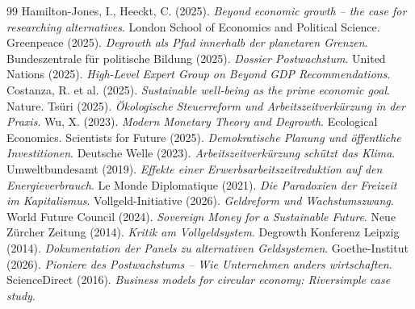 \documentclass[12pt, a4paper]{article}
\begin{document}
\begin{thebibliography}{99}
		 Hamilton-Jones, I., Heeckt, C. (2025). \textit{Beyond economic growth – the case for researching alternatives}. London School of Economics and Political Science.
		 Greenpeace (2025). \textit{Degrowth als Pfad innerhalb der planetaren Grenzen}.
		 Bundeszentrale für politische Bildung (2025). \textit{Dossier Postwachstum}.
		 United Nations (2025). \textit{High-Level Expert Group on Beyond GDP Recommendations}.
		 Costanza, R. et al. (2025). \textit{Sustainable well-being as the prime economic goal}. Nature.
		 Tsüri (2025). \textit{Ökologische Steuerreform und Arbeitszeitverkürzung in der Praxis}.
		 Wu, X. (2023). \textit{Modern Monetary Theory and Degrowth}. Ecological Economics.
		 Scientists for Future (2025). \textit{Demokratische Planung und öffentliche Investitionen}.
		 Deutsche Welle (2023). \textit{Arbeitszeitverkürzung schützt das Klima}.
		 Umweltbundesamt (2019). \textit{Effekte einer Erwerbsarbeitszeitreduktion auf den Energieverbrauch}.
		 Le Monde Diplomatique (2021). \textit{Die Paradoxien der Freizeit im Kapitalismus}.
		 Vollgeld-Initiative (2026). \textit{Geldreform und Wachstumszwang}.
		 World Future Council (2024). \textit{Sovereign Money for a Sustainable Future}.
		 Neue Zürcher Zeitung (2014). \textit{Kritik am Vollgeldsystem}.
		 Degrowth Konferenz Leipzig (2014). \textit{Dokumentation der Panels zu alternativen Geldsystemen}.
		 Goethe-Institut (2026). \textit{Pioniere des Postwachstums – Wie Unternehmen anders wirtschaften}.
		 ScienceDirect (2016). \textit{Business models for circular economy: Riversimple case study}.
		

\end{thebibliography}
\end{document}
